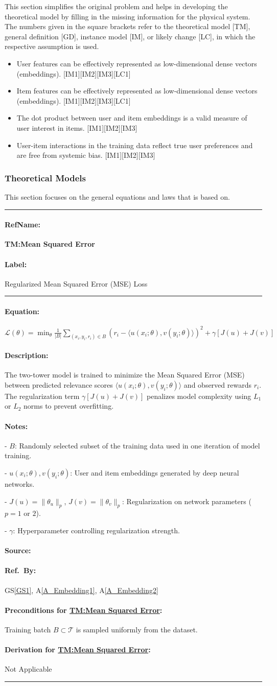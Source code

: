 \documentclass[12pt]{article}
\newcounter{assumpnum} %
\newcommand{\aref}[1]{A\ref{#1}}
\newcommand{\gsref}[1]{GS\ref{#1}}
\newcommand{\deftheory}[9][Not Applicable]
{
\newpage
\noindent \rule{\textwidth}{0.5mm}

\paragraph{RefName: } \textbf{#2} \phantomsection 
\label{#2}

\paragraph{Label:} #3

\noindent \rule{\textwidth}{0.5mm}

\paragraph{Equation:}

#4

\paragraph{Description:}

#5

\paragraph{Notes:}

#6

\paragraph{Source:}

#7

\paragraph{Ref.\ By:}

#8

\paragraph{Preconditions for \hyperref[#2]{#2}:}
\label{#2_precond}

#9

\paragraph{Derivation for \hyperref[#2]{#2}:}
\label{#2_deriv}

#1

\noindent \rule{\textwidth}{0.5mm}

}
\begin{document}
This section simplifies the original problem and helps in developing the
theoretical model by filling in the missing information for the physical system.
The numbers given in the square brackets refer to the theoretical model [TM],
general definition [GD], instance model [IM], or likely
change [LC], in which the respective assumption is used.

\begin{itemize}

\item[A\refstepcounter{assumpnum}\theassumpnum \label{A_Embedding1}:]
User features can be effectively represented as low-dimensional dense vectors (embeddings). [IM1][IM2][IM3][LC1]

\item[A\refstepcounter{assumpnum}\theassumpnum \label{A_Embedding2}:]
Item features can be effectively represented as low-dimensional dense vectors (embeddings). [IM1][IM2][IM3][LC1]


\item[A\refstepcounter{assumpnum}\theassumpnum \label{A_DotProduct}:]
The dot product between user and item embeddings is a valid measure of user interest in items. [IM1][IM2][IM3]

\item[A\refstepcounter{assumpnum}\theassumpnum \label{A_DataQuality}:]
User-item interactions in the training data reflect true user preferences and are free from systemic bias. [IM1][IM2][IM3]
\end{itemize}

\subsubsection{Theoretical Models}\label{sec_theoretical}
This section focuses on the general equations and laws that \progname{} is based
on. 

\deftheory
{TM:Mean Squared Error}
{Regularized Mean Squared Error (MSE) Loss}
{
  $\displaystyle \mathcal{L}(\theta)=\min_{\theta} \frac{1}{|B|} \sum_{(x_i, y_i, r_i) \in B} \left(r_i - \langle u(x_i; \theta), v(y_i; \theta) \rangle \right)^2 + \gamma \left[ J(u) + J(v) \right]$
}
{
  The two-tower model is trained to minimize the Mean Squared Error (MSE) between predicted relevance scores $\langle u(x_i; \theta), v(y_i; \theta) \rangle$ and observed rewards $r_i$. The regularization term $\gamma \left[ J(u) + J(v) \right]$ penalizes model complexity using $L_1$ or $L_2$ norms to prevent overfitting.
}
{
  - $B$: Randomly selected subset of the training data used in one iteration of model training.

  - $u(x_i; \theta), v(y_i; \theta)$: User and item embeddings generated by deep neural networks.  

  - $J(u) = \|\theta_u\|_p$, $J(v) = \|\theta_v\|_p$: Regularization on network parameters ($p=1$ or $2$). 

  - $\gamma$: Hyperparameter controlling regularization strength.  
}
{
  \cite{wiki:Mean_squared_error}
}
{
  \gsref{GS1}, \aref{A_Embedding1}, \aref{A_Embedding2}
}
{
  Training batch $B \subset \mathcal{T}$ is sampled uniformly from the dataset.
}
{}
\end{document}
